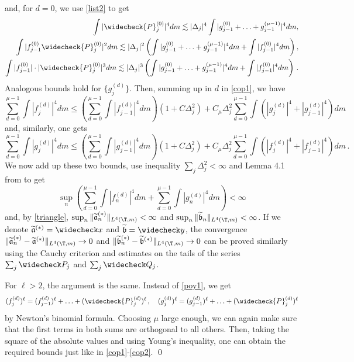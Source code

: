 \documentclass[twoside,a4paper]{amsart}
\def\le{\leqslant}
\theoremstyle{remark}
\numberwithin{equation}{section}
\begin{document}
 and, for $d=0$, we use \eqref{list2} to get
 \begin{eqnarray}
 \int |\widecheck{P}^{(0)}_{j}|^4dm\lesssim |\Delta_j|^4\int | g_{j-1}^{(0)}+\ldots+g^{(\mu-1)}_{j-1}  |^4dm, \\ \int |f^{(0)}_{j-1}\widecheck{P}^{(0)}_j|^2dm\lesssim |\Delta_j|^2\left( \int |  g_{j-1}^{(0)}+\ldots+g^{(\mu-1)}_{j-1}  |^4dm+ \int |f^{(0)}_{j-1}|^4dm\right),\\
  \int |f^{(0)}_{j-1}|\cdot |\widecheck{P}^{(0)}_j|^3dm\lesssim  |\Delta_j|^3\left( \int | g_{j-1}^{(0)}+\ldots+g^{(\mu-1)}_{j-1}   |^4dm+ \int |f^{(0)}_{j-1}|^4dm\right)\,.
 \end{eqnarray}
 Analogous bounds hold for $\{g^{(d)}_j\}$. Then, summing up in $d$ in \eqref{cop1}, we have
 \[
 \sum_{d=0}^{\mu-1}\int |f_j^{(d)}|^4dm\le  \left(\sum_{d=0}^{\mu-1}\int |f_{j-1}^{(d)}|^4dm\right)\left(1+C\Delta_j^2\right)+C_\mu\Delta_j^2\sum_{d=0}^{\mu-1}
  \int (|g^{(d)}_{j}|^4+|g^{(d)}_{j-1}|^4)dm
 \]
 and, similarly, one gets
 \[ \sum_{d=0}^{\mu-1}\int |g_j^{(d)}|^4dm\le  \left(\sum_{d=0}^{\mu-1}\int |g_{j-1}^{(d)}|^4dm\right)\left(1+C\Delta_j^2\right)+C_\mu\Delta_j^2\sum_{d=0}^{\mu-1}
  \int (|f^{(d)}_{j}|^4+|f^{(d)}_{j-1}|^4)dm\,.
\]
 We now add up these two bounds, use inequality $\sum_j \Delta_j^2<\infty$ and Lemma 4.1 from \cite{den26} to get
 \begin{equation}\label{cop2}
\sup_n \left(\sum_{d=0}^{\mu-1}\int |f_n^{(d)}|^4dm+\sum_{d=0}^{\mu-1}\int |g_n^{(d)}|^4dm\right)<\infty
 \end{equation}
 and, by \eqref{triangle}, $\sup_n \|\widetilde{\frak{a}}_n^{(*)}\|_{L^4(\T,m)}<\infty$ and $\sup_n \|\widetilde{\frak{b}}_n\|_{L^4(\T,m)}<\infty$. If we denote $\widetilde{\frak{a}}^{(*)}=\widecheck x$ and $\widetilde{\frak{b}}=\widecheck y$, the convergence $\|\widetilde{\frak{a}}_n^{(*)}-\widetilde{\frak{a}}^{(*)}\|_{L^4(\T,m)}\to 0$ and $\|\widetilde{\frak{b}}_n^{(*)}-\widetilde{\frak{b}}^{(*)}\|_{L^4(\T,m)}\to 0$ can be proved similarly using the Cauchy criterion and estimates on the tails of the series $\sum_j \widecheck P_j$ and $\sum_j \widecheck Q_j$. \smallskip
 
 
 
 For $\ell>2$, the argument is the same. Instead of \eqref{poy1}, we get
 \begin{equation}\label{poy2}
 (f^{(d)}_j)^{\ell}=(f_{j-1}^{(d)})^\ell+\ldots+(\widecheck{P}^{(d)}_j)^\ell\,,\quad  (g^{(d)}_j)^{\ell}=(g_{j-1}^{(d)})^\ell+\ldots+(\widecheck{P}^{(d)}_j)^\ell
 \end{equation}
 by Newton's binomial formula. Choosing  $\mu$ large enough, we can again  make sure that the first terms in both sums are orthogonal to all others. Then, taking  the square of the absolute values and using Young's inequality, one can obtain the required bounds just like in \eqref{cop1}-\eqref{cop2}. \qed
 
\end{document}
